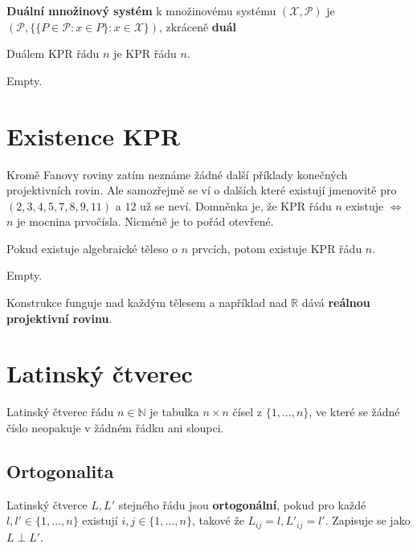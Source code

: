 \begin{definice}
	\textbf{Duální množinový systém} k množinovému systému $(\mathcal{X}, \mathcal{P})$ je $(\mathcal{P}, \{ \{P \in \mathcal{P} : x \in P \}: x \in \mathcal{X} \})$, zkráceně \textbf{duál}
\end{definice}

\begin{tvrz}
	Duálem KPR řádu $n$ je KPR řádu $n$.
\end{tvrz}

\begin{dukaz}
	Empty.
\end{dukaz}

\section{Existence KPR}

Kromě Fanovy roviny zatím neznáme žádné další příklady konečných projektivních rovin. Ale samozřejmě se ví o dalších které existují jmenovitě pro $(2,3,4,5,7,8,9,11)$ a $12$ už se neví. Domněnka je, že KPR řádu $n$ existuje $\Leftrightarrow$ $n$ je mocnina prvočísla. Nicméně je to pořád otevřené.

\begin{veta}
	Pokud existuje algebraické těleso o $n$ prvcích, potom existuje KPR řádu $n$.
\end{veta}

\begin{dukaz}
	Empty.
\end{dukaz}

Konstrukce funguje nad každým tělesem a například nad $\mathbb{R}$ dává \textbf{reálnou projektivní rovinu}.

\section{Latinský čtverec}

\begin{definice}
	Latinský čtverec řádu $n \in \mathbb{N}$ je tabulka $n \times n$ čísel z $\{ 1, \dots, n\}$, ve které se žádné číslo neopakuje v žádném řádku ani sloupci.
\end{definice}

\subsection{Ortogonalita}

\begin{definice}
	Latinský čtverce $L, L'$ stejného řádu jsou \textbf{ortogonální}, pokud pro každé $l, l' \in \{ 1, \dots , n\}$ existují $i,j \in \{ 1, \dots , n\}$, takové že $L_{ij} = l, L'_{ij}=l'$. Zapisuje se jako $L  \perp L'$.
\end{definice}

